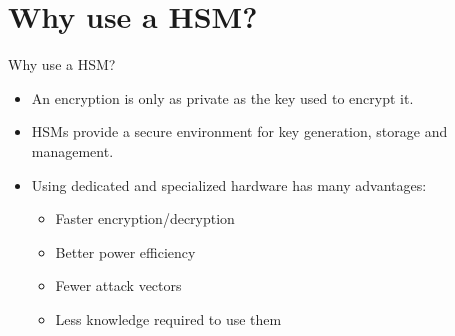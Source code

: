 \section{Why use a HSM?}
\begin{frame}{Why use a HSM?}
    \begin{wide}
            \begin{itemize}
                \item{An encryption is only as private as the key used to encrypt it.}
                \item{HSMs provide a secure environment for key generation, storage and management.}
                \item{Using dedicated and specialized hardware has many advantages: \begin{itemize}
                    \item{Faster encryption/decryption}
                    \item{Better power efficiency}
                    \item{Fewer attack vectors}
                    \item{Less knowledge required to use them}
                \end{itemize}}
            \end{itemize}
    \end{wide}
\end{frame}